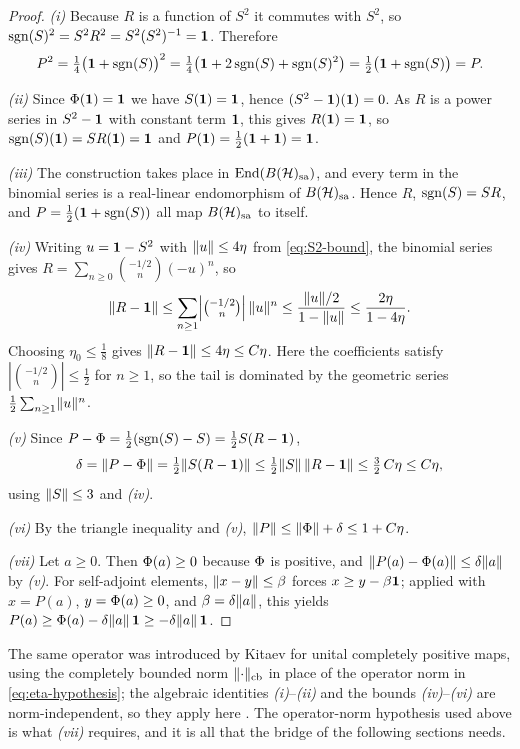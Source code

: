 \begin{proof}
\emph{(i)} Because $R$ is a function of $S^2$ it commutes with $S^2$, so
$\operatorname{sgn}(S)^2=S^2R^2=S^2(S^2)^{-1}=\mathbf{1}$. Therefore
\[
  P^2=\tfrac14\bigl(\mathbf{1}+\operatorname{sgn}(S)\bigr)^2
     =\tfrac14\bigl(\mathbf{1}+2\operatorname{sgn}(S)+\operatorname{sgn}(S)^2\bigr)
     =\tfrac12\bigl(\mathbf{1}+\operatorname{sgn}(S)\bigr)=P.
\]

\emph{(ii)} Since $\Phi(\mathbf{1})=\mathbf{1}$ we have $S(\mathbf{1})=\mathbf{1}$, hence
$(S^2-\mathbf{1})(\mathbf{1})=0$. As $R$ is a power series in $S^2-\mathbf{1}$ with constant term
$\mathbf{1}$, this gives $R(\mathbf{1})=\mathbf{1}$, so $\operatorname{sgn}(S)(\mathbf{1})=S R(\mathbf{1})=\mathbf{1}$ and
$P(\mathbf{1})=\tfrac12(\mathbf{1}+\mathbf{1})=\mathbf{1}$.

\emph{(iii)} The construction takes place in $\mathrm{End}(B(\mathcal{H})_{\mathrm{sa}})$, and every
term in the binomial series is a real-linear endomorphism of $B(\mathcal{H})_{\mathrm{sa}}$. Hence $R$,
$\operatorname{sgn}(S)=SR$, and $P=\tfrac12(\mathbf{1}+\operatorname{sgn}(S))$ all map $B(\mathcal{H})_{\mathrm{sa}}$ to itself.

\emph{(iv)} Writing $u=\mathbf{1}-S^2$ with $\lVert u \rVert\le 4\eta$ from
\eqref{eq:S2-bound}, the binomial series gives
$R=\sum_{n\ge 0}\binom{-1/2}{n}(-u)^n$, so
\[
  \lVert R-\mathbf{1} \rVert
  \le\sum_{n\ge 1}\Bigl|\tbinom{-1/2}{n}\Bigr|\,\lVert u \rVert^n
  \le\frac{\lVert u \rVert/2}{1-\lVert u \rVert}
  \le\frac{2\eta}{1-4\eta}.
\]
Choosing $\eta_0\le\tfrac18$ gives $\lVert R-\mathbf{1} \rVert\le4\eta\le C\eta$. Here the
coefficients satisfy $|\binom{-1/2}{n}|\le\tfrac12$ for $n\ge1$, so the tail is
dominated by the geometric series $\tfrac12\sum_{n\ge1}\lVert u \rVert^n$.

\emph{(v)} Since $P-\Phi=\tfrac12(\operatorname{sgn}(S)-S)=\tfrac12 S(R-\mathbf{1})$,
\[
  \delta=\lVert P-\Phi \rVert=\tfrac12\lVert S(R-\mathbf{1}) \rVert
   \le\tfrac12\lVert S \rVert\,\lVert R-\mathbf{1} \rVert\le\tfrac32\, C\eta\le C\eta,
\]
using $\lVert S \rVert\le 3$ and \emph{(iv)}.

\emph{(vi)} By the triangle inequality and \emph{(v)},
$\lVert P \rVert\le\lVert \Phi \rVert+\delta\le 1+C\eta$.

\emph{(vii)} Let $a\ge 0$. Then $\Phi(a)\ge 0$ because $\Phi$ is
positive, and $\lVert P(a)-\Phi(a) \rVert\le\delta\lVert a \rVert$ by \emph{(v)}. For
self-adjoint elements, $\lVert x-y \rVert\le\beta$ forces $x\ge y-\beta\mathbf{1}$; applied
with $x=P(a)$, $y=\Phi(a)\ge0$, and $\beta=\delta\lVert a \rVert$, this yields
$P(a)\ge\Phi(a)-\delta\lVert a \rVert\,\mathbf{1}\ge-\delta\lVert a \rVert\,\mathbf{1}$. \qedhere
\end{proof}

\begin{remark}\label{rem:kitaev-spectral-comparison}
The same operator was introduced by Kitaev for unital completely positive
maps, using the completely bounded norm $\lVert \cdot \rVert_{\mathrm{cb}}$ in place
of the operator norm in \eqref{eq:eta-hypothesis}; the algebraic identities
\emph{(i)}--\emph{(ii)} and the bounds \emph{(iv)}--\emph{(vi)} are
norm-independent, so they apply here \cite[Prop.~P]{Kitaev2024}. The
operator-norm hypothesis used above is what 
\emph{(vii)} requires, and it is all that the bridge of the following sections
needs.
\end{remark}

